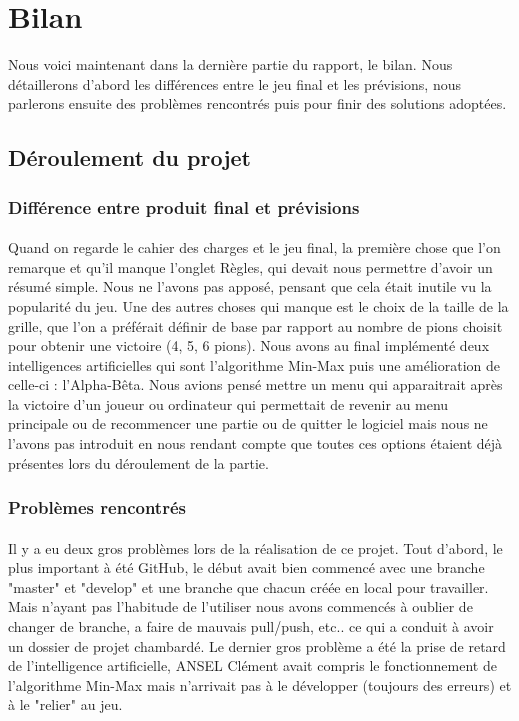 \documentclass[a4paper,oneside]{article}
\begin{document}
\section{Bilan}

Nous voici maintenant dans la dernière partie du rapport, le bilan. 
Nous détaillerons d'abord les différences entre le jeu final et les prévisions, nous parlerons ensuite des problèmes rencontrés puis pour finir des solutions adoptées.

\subsection{Déroulement du projet}
\subsubsection{Différence entre produit final et prévisions}
\paragraph{}
Quand on regarde le cahier des charges et le jeu final, la première chose que l'on remarque et qu'il manque l'onglet Règles, qui devait nous permettre d'avoir un résumé simple.
Nous ne l'avons pas apposé, pensant que cela était inutile vu la popularité du jeu. Une des autres choses qui manque est le choix de la taille de la grille, que l'on a préférait définir de base par rapport au nombre de pions choisit pour obtenir une victoire (4, 5, 6 pions).
Nous avons au final implémenté deux intelligences artificielles qui sont l'algorithme Min-Max puis une amélioration de celle-ci : l'Alpha-Bêta.
Nous avions pensé mettre un menu qui apparaitrait après la victoire d'un joueur ou ordinateur qui permettait de revenir au menu principale ou de recommencer une partie ou de quitter le logiciel mais nous ne l'avons pas introduit en nous rendant compte que toutes ces options étaient déjà présentes lors du déroulement de la partie.

\subsubsection{Problèmes rencontrés}
\paragraph{}
Il y a eu deux gros problèmes lors de la réalisation de ce projet.
Tout d'abord, le plus important à été GitHub, le début avait bien commencé avec une branche "master" et "develop" et une branche que chacun créée en local pour travailler.
Mais n'ayant pas l'habitude de l'utiliser nous avons commencés à oublier de changer de branche, a faire de mauvais pull/push, etc.. ce qui a conduit à avoir un dossier de projet chambardé.
Le dernier gros problème a été la prise de retard de l'intelligence artificielle, ANSEL Clément avait compris le fonctionnement de l'algorithme Min-Max mais n'arrivait pas à le développer (toujours des erreurs) et à le "relier" au jeu.
\end{document}
